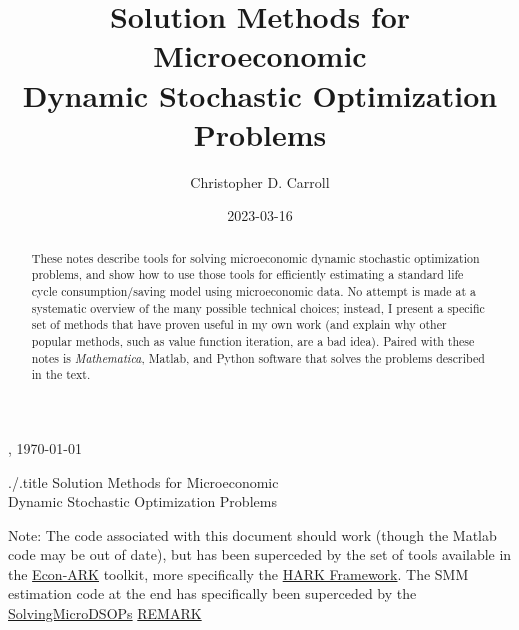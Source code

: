 \documentclass[titlepage, headings=optiontotocandhead]{\econtex}
\begin{document}
\renewcommand{\onlyinsubfile}[1]{}\renewcommand{\notinsubfile}[1]{#1}

\hfill{\tiny \jobname, \today}

\begin{verbatimwrite}{./\texname.title}
  Solution Methods for Microeconomic \\ Dynamic Stochastic Optimization Problems
\end{verbatimwrite}

\title{Solution Methods for Microeconomic \\ Dynamic Stochastic Optimization Problems}

\author{Christopher D. Carroll\authNum}


\date{2023-03-16}
\maketitle

\noindent  Note: The code associated with this document should work (though the Matlab code may be out of date), but has been superceded by the set of tools available in the \href{https://github.com/econ-ark/HARK}{Econ-ARK} toolkit, more specifically the \href{https://github.com/econ-ark/HARK}{HARK Framework}.  The SMM estimation code at the end has specifically been superceded by the \href{https://econ-ark.org/materials/solvingmicrodsops?launch}{SolvingMicroDSOPs} \href{https://github.com/econ-ark/REMARK}{REMARK}


\hypertarget{Abstract}{}
\begin{abstract}
  These notes describe tools for solving microeconomic dynamic stochastic optimization problems, and show how to use those tools for efficiently estimating a standard life cycle consumption/saving model using microeconomic data.  No attempt is made at a systematic overview of the many possible technical choices; instead, I present a specific set of methods that have proven useful in my own work (and explain why other popular methods, such as value function iteration, are a bad idea).  Paired with these notes is \textit{Mathematica}, Matlab, and Python software that solves the problems described in the text.
\end{abstract}
\end{document}
